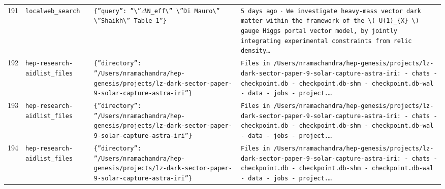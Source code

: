 \documentclass[11pt,a4paper]{article}
\begin{document}
\begin{longtable}{@{}p{}p{}p{}p{}@{}}
191 & \texttt{local}\newline\texttt{web\_\allowbreak{}search} & \texttt{\{''query'':\allowbreak{} ''\textbackslash{}\allowbreak{}''$\Delta$N\_\allowbreak{}eff\textbackslash{}\allowbreak{}'' \textbackslash{}\allowbreak{}''Di Mauro\textbackslash{}\allowbreak{}'' \textbackslash{}\allowbreak{}''Shaikh\textbackslash{}\allowbreak{}'' Table 1''\}\allowbreak{}} & \texttt{5 days ago $\cdot$ We investigate heavy-mass vector dark matter within the framework of the \textbackslash{}\allowbreak{}( U(1)\allowbreak{}\_\allowbreak{}\{X\}\allowbreak{} \textbackslash{}\allowbreak{})\allowbreak{} gauge Higgs portal vector model,\allowbreak{} by jointly integrating experimental constraints from relic density\ldots{}\allowbreak{}} \\
192 & \texttt{hep-research-aid}\newline\texttt{list\_\allowbreak{}files} & \texttt{\{''directory'':\allowbreak{} ''/\allowbreak{}Users/\allowbreak{}nramachandra/\allowbreak{}hep-genesis/\allowbreak{}projects/\allowbreak{}lz-dark-sector-paper-9-solar-capture-astra-iri''\}\allowbreak{}} & \texttt{Files in /\allowbreak{}Users/\allowbreak{}nramachandra/\allowbreak{}hep-genesis/\allowbreak{}projects/\allowbreak{}lz-dark-sector-paper-9-solar-capture-astra-iri:\allowbreak{}   - chats   - checkpoint.db   - checkpoint.db-shm   - checkpoint.db-wal   - data   - jobs   - project.\ldots{}\allowbreak{}} \\
193 & \texttt{hep-research-aid}\newline\texttt{list\_\allowbreak{}files} & \texttt{\{''directory'':\allowbreak{} ''/\allowbreak{}Users/\allowbreak{}nramachandra/\allowbreak{}hep-genesis/\allowbreak{}projects/\allowbreak{}lz-dark-sector-paper-9-solar-capture-astra-iri''\}\allowbreak{}} & \texttt{Files in /\allowbreak{}Users/\allowbreak{}nramachandra/\allowbreak{}hep-genesis/\allowbreak{}projects/\allowbreak{}lz-dark-sector-paper-9-solar-capture-astra-iri:\allowbreak{}   - chats   - checkpoint.db   - checkpoint.db-shm   - checkpoint.db-wal   - data   - jobs   - project.\ldots{}\allowbreak{}} \\
194 & \texttt{hep-research-aid}\newline\texttt{list\_\allowbreak{}files} & \texttt{\{''directory'':\allowbreak{} ''/\allowbreak{}Users/\allowbreak{}nramachandra/\allowbreak{}hep-genesis/\allowbreak{}projects/\allowbreak{}lz-dark-sector-paper-9-solar-capture-astra-iri''\}\allowbreak{}} & \texttt{Files in /\allowbreak{}Users/\allowbreak{}nramachandra/\allowbreak{}hep-genesis/\allowbreak{}projects/\allowbreak{}lz-dark-sector-paper-9-solar-capture-astra-iri:\allowbreak{}   - chats   - checkpoint.db   - checkpoint.db-shm   - checkpoint.db-wal   - data   - jobs   - project.\ldots{}\allowbreak{}} \\

\end{longtable}
\end{document}
